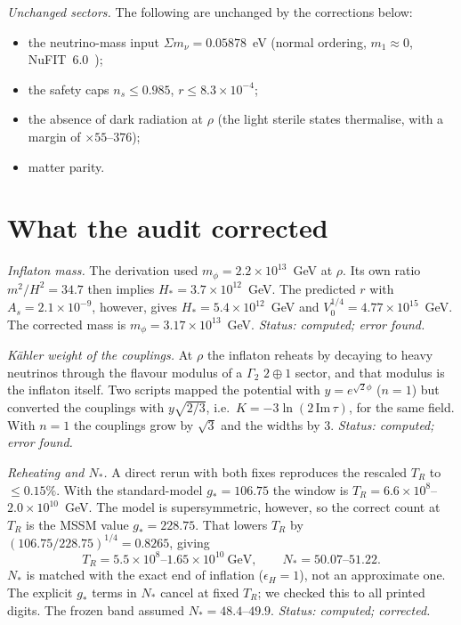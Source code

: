\documentclass[aps,prd,twocolumn,superscriptaddress,nofootinbib,showkeys]{revtex4-2}
\begin{document}
\emph{Unchanged sectors.} The following are unchanged by the corrections below:
\begin{itemize}
\item the neutrino-mass input $\Sigma m_\nu=0.05878$~eV (normal ordering, $m_1\approx0$, NuFIT~6.0~\cite{NuFIT});
\item the safety caps $n_s\le0.985$, $r\le8.3\times10^{-4}$;
\item the absence of dark radiation at $\rho$ (the light sterile states thermalise, with a margin of $\times55$--$376$);
\item matter parity.
\end{itemize}

\section{What the audit corrected}
\emph{Inflaton mass.} The derivation used $m_\phi=2.2\times10^{13}$~GeV at $\rho$. Its own ratio $m^2/H^2=34.7$ then implies $H_*=3.7\times10^{12}$~GeV. The predicted $r$ with $A_s=2.1\times10^{-9}$, however, gives $H_*=5.4\times10^{12}$~GeV and $V_0^{1/4}=4.77\times10^{15}$~GeV. The corrected mass is $m_\phi=3.17\times10^{13}$~GeV. \emph{Status: computed; error found.}

\emph{Kähler weight of the couplings.} At $\rho$ the inflaton reheats by decaying to heavy neutrinos through the flavour modulus of a $\Gamma_2$ $2\oplus1$ sector, and that modulus is the inflaton itself. Two scripts mapped the potential with $y=e^{\sqrt2\phi}$ ($n=1$) but converted the couplings with $y\sqrt{2/3}$, i.e.\ $K=-3\ln(2\,\mathrm{Im}\,\tau)$, for the same field. With $n=1$ the couplings grow by $\sqrt3$ and the widths by 3. \emph{Status: computed; error found.}

\emph{Reheating and $N_*$.} A direct rerun with both fixes reproduces the rescaled $T_R$ to $\le0.15\%$. With the standard-model $g_*=106.75$ the window is $T_R=6.6\times10^8$--$2.0\times10^{10}$~GeV. The model is supersymmetric, however, so the correct count at $T_R$ is the MSSM value $g_*=228.75$. That lowers $T_R$ by $(106.75/228.75)^{1/4}=0.8265$, giving
\begin{equation}
T_R=5.5\times10^8\text{--}1.65\times10^{10}~\text{GeV},\qquad N_*=50.07\text{--}51.22 .
\end{equation}
$N_*$ is matched with the exact end of inflation ($\epsilon_H=1$), not an approximate one. The explicit $g_*$ terms in $N_*$ cancel at fixed $T_R$; we checked this to all printed digits. The frozen band assumed $N_*=48.4$--$49.9$. \emph{Status: computed; corrected.}
\end{document}
